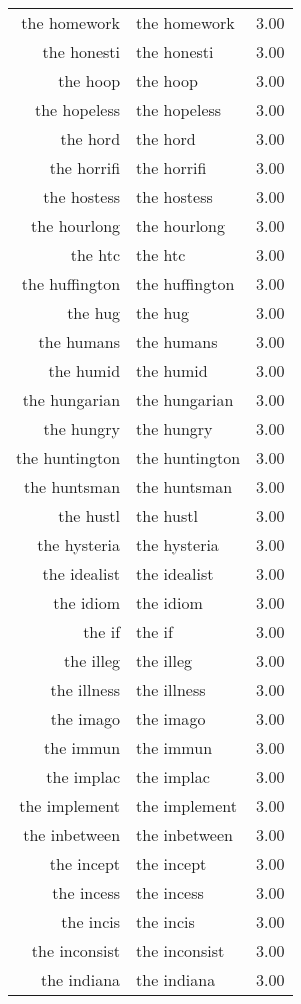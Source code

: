 \begin{table}[ht]
\begin{tabular}{rlr}
  the homework & the homework & 3.00 \\ 
  the honesti & the honesti & 3.00 \\ 
  the hoop & the hoop & 3.00 \\ 
  the hopeless & the hopeless & 3.00 \\ 
  the hord & the hord & 3.00 \\ 
  the horrifi & the horrifi & 3.00 \\ 
  the hostess & the hostess & 3.00 \\ 
  the hourlong & the hourlong & 3.00 \\ 
  the htc & the htc & 3.00 \\ 
  the huffington & the huffington & 3.00 \\ 
  the hug & the hug & 3.00 \\ 
  the humans & the humans & 3.00 \\ 
  the humid & the humid & 3.00 \\ 
  the hungarian & the hungarian & 3.00 \\ 
  the hungry & the hungry & 3.00 \\ 
  the huntington & the huntington & 3.00 \\ 
  the huntsman & the huntsman & 3.00 \\ 
  the hustl & the hustl & 3.00 \\ 
  the hysteria & the hysteria & 3.00 \\ 
  the idealist & the idealist & 3.00 \\ 
  the idiom & the idiom & 3.00 \\ 
  the if & the if & 3.00 \\ 
  the illeg & the illeg & 3.00 \\ 
  the illness & the illness & 3.00 \\ 
  the imago & the imago & 3.00 \\ 
  the immun & the immun & 3.00 \\ 
  the implac & the implac & 3.00 \\ 
  the implement & the implement & 3.00 \\ 
  the inbetween & the inbetween & 3.00 \\ 
  the incept & the incept & 3.00 \\ 
  the incess & the incess & 3.00 \\ 
  the incis & the incis & 3.00 \\ 
  the inconsist & the inconsist & 3.00 \\ 
  the indiana & the indiana & 3.00 \\ 

\end{tabular}
\end{table}
